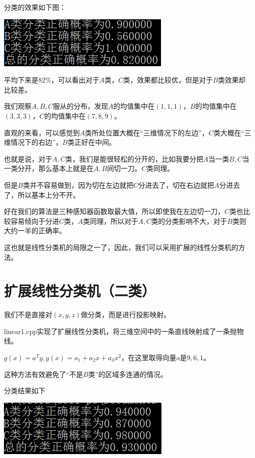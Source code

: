 \documentclass{ctexart}
\begin{document}
分类的效果如下图：

\includegraphics{3.png}

平均下来是$82\%$，可以看出对于$A$类，$C$类，效果都比较优，但是对于$B$类效果却比较差。

我们观察$A,B,C$服从的分布，发现$A$的均值集中在$(1,1,1)$，$B$的均值集中在$(3,3,3)$，$C$的均值集中在$(7,8,9)$。

直观的来看，可以感觉到$A$类所处位置大概在“三维情况下的左边”，$C$类大概在“三维情况下的右边”，$B$类正好在中间。

也就是说，对于$A,C$类，我们是能很轻松的分开的，比如我要分把$A$当一类$B,C$当一类分开，那么基本上就是在$A,B$间切一刀。$C$类同理。

但是$B$类并不容易做到，因为切在左边就把$C$分进去了，切在右边就把$A$分进去了，所以基本上分不开。

好在我们的算法是三种感知器函数取最大值，所以即使我在左边切一刀，$C$类也比较容易倾向于分进$C$类，$A$类同理，所以对于$A,C$类的分类影响不大，对于$B$类则大约一半的正确率。

这也就是线性分类机的局限之一了，因此，我们可以采用扩展的线性分类机的方法。

\section{扩展线性分类机（二类）}
我们不是直接对$(x,y,z)$做分类，而是进行投影映射。

linear1.cpp实现了扩展线性分类机，将三维空间中的一条直线映射成了一条抛物线。

$g(x)=a^Ty,y(x)=a_1+a_2x+a_3x^2$，在这里取得向量$a$是$9,6,1$。

这种方法有效避免了“不是$B$类”的区域多连通的情况。

分类结果如下

\includegraphics{4.png}
\end{document}
